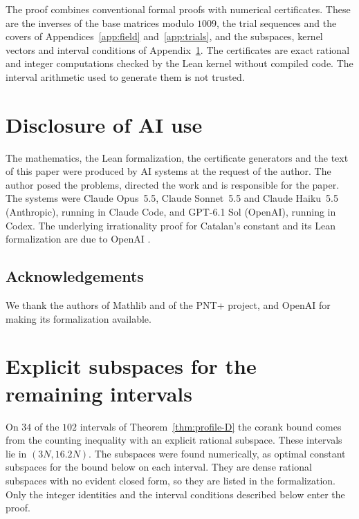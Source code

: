\documentclass[11pt]{amsart}
\theoremstyle{definition}
\theoremstyle{remark}
\numberwithin{equation}{section}
\begin{document}
The proof combines conventional formal proofs with numerical certificates. These are the inverses of the base
matrices modulo $1009$, the trial sequences and the covers of Appendices~\ref{app:field} and~\ref{app:trials},
and the subspaces, kernel vectors and interval conditions of Appendix~\ref{app:windows}. The certificates are
exact rational and integer computations checked by the Lean kernel without compiled code. The interval
arithmetic used to generate them \cite{Arb} is not trusted.

\section*{Disclosure of AI use}
The mathematics, the Lean formalization, the certificate generators and the text of this paper were produced
by AI systems at the request of the author. The author posed the problems, directed the work and is
responsible for the paper. The systems were Claude Opus~5.5, Claude Sonnet~5.5 and Claude Haiku~5.5
(Anthropic), running in Claude Code, and GPT-6.1 Sol (OpenAI), running in Codex. The underlying
irrationality proof for Catalan's constant and its Lean formalization are due to OpenAI \cite{OpenAI2026}.

\subsection*{Acknowledgements}
We thank the authors of Mathlib and of the PNT+ project, and OpenAI for making its formalization available.

\appendix
\section{Explicit subspaces for the remaining intervals}\label{app:windows}

On $34$ of the $102$ intervals of Theorem~\ref{thm:profile-D} the corank bound comes from the counting
inequality with an explicit rational subspace. These intervals lie in $(3N,16.2N)$. The subspaces were found
numerically, as optimal constant subspaces for the bound below on each interval. They are dense rational
subspaces with no evident closed form, so they are listed in the formalization. Only the integer identities
and the interval conditions described below enter the proof.
\end{document}
